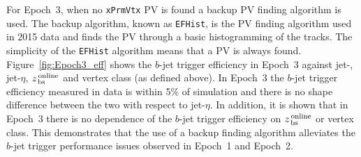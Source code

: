 
\newpage
For Epoch~3, when no \verb|xPrmVtx| PV is found a backup PV finding algorithm is used.
The backup algorithm, known as \verb|EFHist|, is the PV finding algorithm used in 2015 data and finds the PV through a basic histogramming of the tracks.
The simplicity of the \verb|EFHist| algorithm means that a PV is always found.
Figure~\ref{fig:Epoch3_eff} shows the $b$-jet trigger efficiency in Epoch~3 against jet-\pT, jet-$\eta$,  $z_{\,\text{bs}}^{\text{\,online}}$ and vertex class (as defined above).
In Epoch~3 the $b$-jet trigger efficiency measured in data is within 5\% of simulation and there is no shape difference between the two with respect to jet-$\eta$.
In addition, it is shown that in Epoch~3 there is no dependence of the $b$-jet trigger efficiency on $z_{\,\text{bs}}^{\text{\,online}}$ or vertex class.
This demonstrates that the use of a backup finding algorithm alleviates the $b$-jet trigger performance issues observed in Epoch~1 and Epoch~2.

